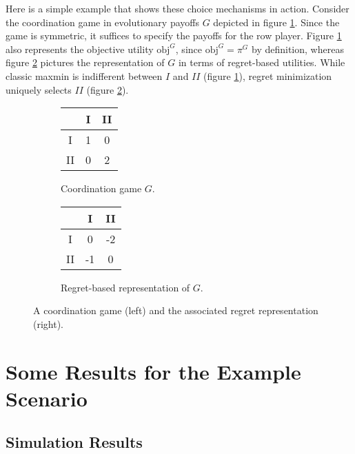 \documentclass[fleqn,reqno,12pt]{article}
\theoremstyle{Satz}
\theoremstyle{Bsp}
\begin{document}
Here is a simple example that shows these choice mechanisms in action. Consider the
coordination game in evolutionary payoffs $G$ depicted in figure \ref{coordgame1}. Since the
game is symmetric, it suffices to specify the payoffs for the row player. Figure
\ref{coordgame1} also represents the objective utility $\text{obj}^G$, since
$\text{obj}^G= \pi^G$ by definition, whereas figure \ref{coordgame1reg} pictures the
representation of $G$ in terms of regret-based utilities. While classic maxmin is indifferent
between $I$ and $II$ (figure \ref{coordgame1}), regret minimization uniquely selects $II$
(figure \ref{coordgame1reg}).
\begin{figure}
\begin{center}
  \begin{subfigure}[b]{0.3\textwidth}
    \centering
    \begin{tabular}{ccc}
      \toprule
      & I & II \\
      \midrule
      I & 1 & 0 \\
      II & 0 & 2\\
      \bottomrule
    \end{tabular}
    \caption{Coordination game $G$.}
    \label{coordgame1}
  \end{subfigure}
  \hspace{1cm}
  \begin{subfigure}[b]{0.5\textwidth}
    \centering
    \begin{tabular}{ccc}
      \toprule
      & I & II \\
      \midrule
      I & 0 & -2 \\
      II & -1 & 0\\
      \bottomrule
    \end{tabular}
    \caption{Regret-based representation of $G$.}
    \label{coordgame1reg}
  \end{subfigure}
  \caption{A coordination game (left) and the associated regret representation (right).}
    \label{coordgame1mainFig}
    \end{center}
\end{figure}


\section{Some Results for the Example Scenario}\label{sec:results}

\subsection{Simulation Results}
\label{sec:simulation-results}
\end{document}
